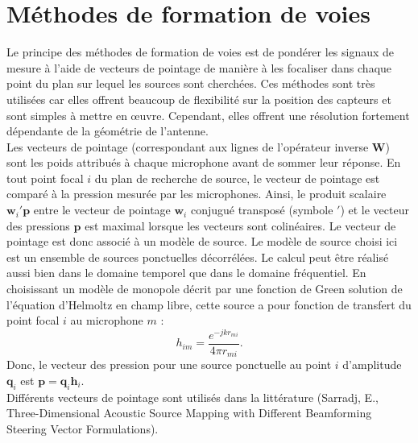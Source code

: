 \chapter{Méthodes de formation de voies}

Le principe des méthodes de formation de voies est de pondérer les signaux de mesure à l'aide de vecteurs de pointage de manière à les focaliser dans chaque point du plan sur lequel les sources sont cherchées.
Ces méthodes sont très utilisées car elles offrent beaucoup de flexibilité sur la position des capteurs et sont simples à mettre en œuvre. Cependant, elles offrent une résolution fortement dépendante de la géométrie de l'antenne.\\
Les vecteurs de pointage (correspondant aux lignes de l'opérateur inverse $\bm{W}$) sont les poids attribués à chaque microphone avant de sommer leur réponse.  En tout point focal $i$ du plan de recherche de source, le vecteur de pointage est comparé à la pression mesurée par les microphones. Ainsi, le produit scalaire $\bm{w}_i'\bm{p}$ entre le vecteur de pointage $\bm{w}_i$ conjugué transposé (symbole $'$) et le vecteur des pressions $\bm{p}$ est maximal lorsque les vecteurs sont colinéaires. Le vecteur de pointage est donc associé à un modèle de source. Le modèle de source choisi ici est un ensemble de sources ponctuelles décorrélées. Le calcul peut être réalisé aussi bien dans le domaine temporel que dans le domaine fréquentiel. En choisissant un modèle de monopole décrit par une fonction de Green solution de l'équation d'Helmoltz en champ libre, cette source a pour fonction de transfert du point focal $i$ au microphone $m$ : 
\begin{equation}
	h_{im}=\frac{e^{-jkr_{mi}}}{4\pi r_{mi}}.
\end{equation}
Donc, le vecteur des pression pour une source ponctuelle au point $i$ d'amplitude $\bm{q}_i$ est $\bm{p}=\bm{q}_i\bm{h}_i$.\\
Différents vecteurs de pointage sont utilisés dans la littérature (Sarradj, E., Three-Dimensional Acoustic Source Mapping with Different Beamforming Steering Vector Formulations).


